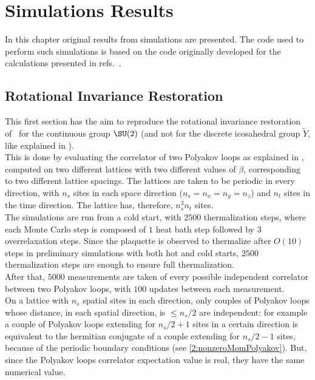 \pagestyle{myFancy}
\chapter{Simulations Results}
In this chapter original results from simulations are presented.
The code used to perform such simulations is based on the code originally developed for the calculations presented in refs.~\cite{Panero:2009tv,Mykkanen:2012ri}.

\section{Rotational Invariance Restoration}
This first section has the aim to reproduce the rotational invariance restoration of~\cite{Lang:1982tj} for the continuous group $\SU(2)$ (and not for the discrete icosahedral group $\tilde{Y}$, like explained in ).\\
This is done by evaluating the correlator of two Polyakov loops as explained in , computed on two different lattices with two different values of $\beta$, corresponding to two different lattice spacings.
The lattices are taken to be periodic in every direction, with $n_s$ sites in each space direction ($n_s=n_x=n_y=n_z$) and $n_t$ sites in the time direction.
The lattice has, therefore, $n_s^3n_t$ sites.\\
The simulations are run from a cold start, with $2500$ thermalization steps, where each Monte Carlo step is composed of $1$ heat bath step followed by $3$ overrelaxation steps.
Since the plaquette is observed to thermalize after $O(10)$ steps in preliminary simulations with both hot and cold starts, $2500$ thermalization steps are enough to ensure full thermalization.\\
After that, $5000$ measurements are taken of every possible independent correlator between two Polyakov loops, with $100$ updates between each measurement.\\
On a lattice with $n_s$ spatial sites in each direction, only couples of Polyakov loops whose distance, in each spatial direction, is $\leq n_s/2$ are independent: for example a couple of Polyakov loops extending for $n_s/2+1$ sites in a certain direction is equivalent to the hermitian conjugate of a couple extending for $n_s/2-1$ sites, because of the periodic boundary conditions (see \eqref{2:nonzeroMomPolyakov}).
But, since the Polyakov loops correlator expectation value is real, they have the same numerical value.\\

